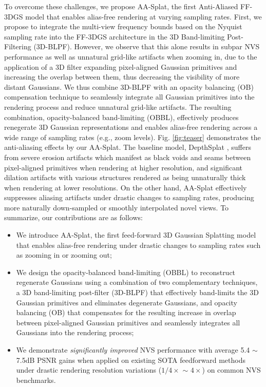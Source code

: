 \documentclass[runningheads]{llncs}
\begin{document}
To overcome these challenges, we propose AA-Splat, the first Anti-Aliased FF-3DGS model that enables alias-free rendering at varying sampling rates. First, we propose to integrate the multi-view frequency bounds \cite{yu2024mip} based on the Nyquist sampling rate into the FF-3DGS architecture in the 3D Band-limiting Post-Filtering (3D-BLPF). However, we observe that this alone results in subpar NVS performance as well as unnatural grid-like artifacts when zooming in, due to the application of a 3D filter expanding pixel-aligned Gaussian primitives and increasing the overlap between them, thus decreasing the visibility of more distant Gaussians. We thus combine 3D-BLPF with an opacity balancing (OB) compensation technique to seamlessly integrate all Gaussian primitives into the rendering process and reduce unnatural grid-like artifacts. The resulting combination, opacity-balanced band-limiting (OBBL), effectively produces renegerate 3D Gaussian representations and enables alias-free rendering across a wide range of sampling rates (e.g., zoom levels). Fig. \ref{fig:teaser} demonstrates the anti-aliasing effects by our AA-Splat. The baseline model, DepthSplat \cite{xu2025depthsplat}, suffers from severe erosion artifacts which manifest as black voids and seams between pixel-aligned primitives when rendering at higher resolution, and significant dilation artifacts with various structures rendered as being unnaturally thick when rendering at lower resolutions. On the other hand, AA-Splat effectively suppresses aliasing artifacts under drastic changes to sampling rates, producing more naturally down-sampled or smoothly interpolated novel views. To summarize, our contributions are as follows:
\begin{itemize}
    \item We introduce AA-Splat, the first feed-forward 3D Gaussian Splatting model that enables alias-free rendering under drastic changes to sampling rates such as zooming in or zooming out;
    \item We design the opacity-balanced band-limiting (OBBL) to reconstruct regenerate Gaussians using a combination of two complementary techniques,
    a 3D band-limiting post-filter (3D-BLPF) that effectively band-limits the 3D Gaussian primitives and eliminates degenerate Gaussians,
    and opacity balancing (OB) that compensates for the resulting increase in overlap between pixel-aligned Gaussian primitives and seamlessly integrates all Gaussians into the rendering process;
    \item We demonstrate \textit{significantly improved} NVS performance with average 5.4 $\sim$ 7.5dB PSNR gains when applied on existing SOTA feedforward methods under drastic rendering resolution variations ($1/4\times$ $\sim$ $4\times$) on common NVS benchmarks.
\end{itemize}
\end{document}
